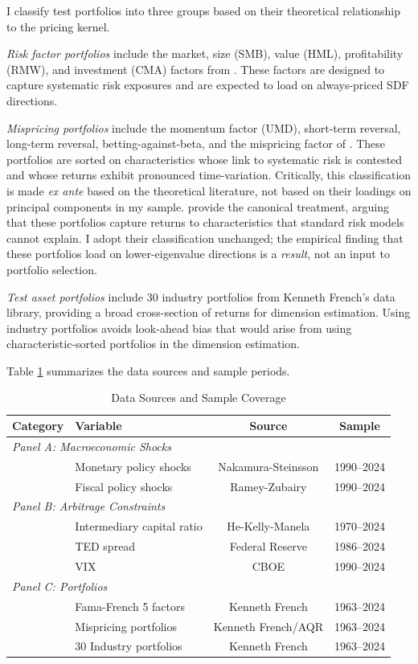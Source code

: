 \documentclass[12pt,letterpaper]{article}
\theoremstyle{plain}
\theoremstyle{definition}
\begin{document}
I classify test portfolios into three groups based on their theoretical relationship to the pricing kernel.

\textit{Risk factor portfolios} include the market, size (SMB), value (HML), profitability (RMW), and investment (CMA) factors from \cite{fama2015five}. These factors are designed to capture systematic risk exposures and are expected to load on always-priced SDF directions.

\textit{Mispricing portfolios} include the momentum factor (UMD), short-term reversal, long-term reversal, betting-against-beta, and the mispricing factor of \cite{stambaugh2015mispricing}. These portfolios are sorted on characteristics whose link to systematic risk is contested and whose returns exhibit pronounced time-variation. Critically, this classification is made \textit{ex ante} based on the theoretical literature, not based on their loadings on principal components in my sample. \cite{stambaugh2015mispricing} provide the canonical treatment, arguing that these portfolios capture returns to characteristics that standard risk models cannot explain. I adopt their classification unchanged; the empirical finding that these portfolios load on lower-eigenvalue directions is a \textit{result}, not an input to portfolio selection.

\textit{Test asset portfolios} include 30 industry portfolios from Kenneth French's data library, providing a broad cross-section of returns for dimension estimation. Using industry portfolios avoids look-ahead bias that would arise from using characteristic-sorted portfolios in the dimension estimation.

Table \ref{tab:data_summary} summarizes the data sources and sample periods.

\begin{table}[htbp]
\centering
\caption{Data Sources and Sample Coverage}
\label{tab:data_summary}
\begin{tabular}{llcc}
\toprule
Category & Variable & Source & Sample \\
\midrule
\multicolumn{4}{l}{\textit{Panel A: Macroeconomic Shocks}} \\
& Monetary policy shocks & Nakamura-Steinsson & 1990--2024 \\
& Fiscal policy shocks & Ramey-Zubairy & 1990--2024 \\
\midrule
\multicolumn{4}{l}{\textit{Panel B: Arbitrage Constraints}} \\
& Intermediary capital ratio & He-Kelly-Manela & 1970--2024 \\
& TED spread & Federal Reserve & 1986--2024 \\
& VIX & CBOE & 1990--2024 \\
\midrule
\multicolumn{4}{l}{\textit{Panel C: Portfolios}} \\
& Fama-French 5 factors & Kenneth French & 1963--2024 \\
& Mispricing portfolios & Kenneth French/AQR & 1963--2024 \\
& 30 Industry portfolios & Kenneth French & 1963--2024 \\
\bottomrule
\end{tabular}
\end{table}
\end{document}
